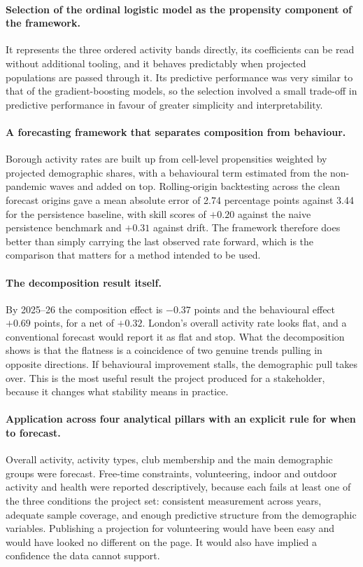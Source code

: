 \documentclass[ %
                    author={Ashrey Ashrey, Sanya Kapoor, Trisha Sharma, Yash Bhooshan Pandloskar},
                supervisor={Dr. Dalila O’Grady},
                    degree={MSc},
                     title={Using machine learning to forecast physical activity participation, volunteering and activity patterns in London},
                  subtitle={},
                      type={},
                      year={2021}]{dissertation}
\begin{document}
\paragraph{Selection of the ordinal logistic model as the propensity component of the framework.}
It represents the three ordered activity bands directly, its coefficients can be read without additional tooling, and it behaves predictably when projected populations are passed through it. Its predictive performance was very similar to that of the gradient-boosting models, so the selection involved a small trade-off in predictive performance in favour of greater simplicity and interpretability.

\paragraph{A forecasting framework that separates composition from behaviour.}
Borough activity rates are built up from cell-level propensities weighted by projected demographic shares, with a behavioural term estimated from the
non-pandemic waves and added on top. Rolling-origin backtesting across the clean forecast origins gave a mean absolute error of 2.74 percentage points against 3.44 for the persistence baseline, with skill scores of $+0.20$ against the naive persistence benchmark and $+0.31$ against drift. The framework therefore does better than simply carrying the last observed rate forward, which is the comparison that matters for a method intended to be used.

\paragraph{The decomposition result itself.}
By 2025--26 the composition effect is $-0.37$ points and the behavioural effect $+0.69$ points, for a net of $+0.32$. London's overall activity rate looks flat, and a conventional forecast would report it as flat and stop. What the decomposition shows is that the flatness is a coincidence of two genuine trends pulling in opposite directions. If behavioural improvement stalls, the demographic pull takes over. This is the most useful result the project produced for a stakeholder, because it changes what stability means in practice.

\paragraph{Application across four analytical pillars with an explicit rule for when to forecast.}
Overall activity, activity types, club membership and the main demographic groups were forecast. Free-time constraints, volunteering, indoor and outdoor activity and health were reported descriptively, because each fails at least one of the three conditions the project set: consistent measurement across years, adequate sample coverage, and enough predictive structure from the demographic variables. Publishing a projection for volunteering would have been easy and would have looked no different on the page. It would also have implied a confidence the data cannot support.
\end{document}
